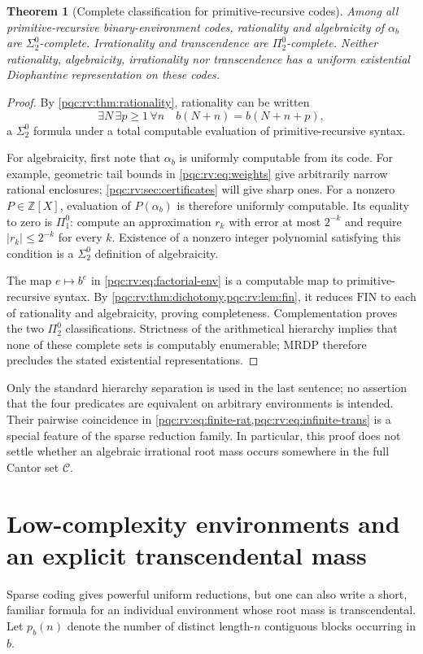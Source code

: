 \documentclass[11pt,letterpaper]{article}
\numberwithin{equation}{section}
\newtheorem{theorem}{Theorem}[section]
\theoremstyle{definition}
\theoremstyle{remark}
\newcommand{\Z}{\mathbb Z}
\newcommand{\srcmark}[1]{\par\noindent{\small\itshape [source~#1]}\par}
\begin{document}
\begin{theorem}[Complete classification for primitive-recursive codes]
\label{pqc:rv:thm:hierarchy}
Among all primitive-recursive binary-environment codes, rationality
and algebraicity of $\alpha_b$ are $\Sigma^0_2$-complete.
Irrationality and transcendence are $\Pi^0_2$-complete.
Neither rationality, algebraicity, irrationality nor transcendence
has a uniform existential Diophantine representation on these codes.
\end{theorem}
\begin{proof}
By \cref{pqc:rv:thm:rationality}, rationality can be written
\[
 \exists N\,\exists p\geq1\,\forall n\quad
 b(N+n)=b(N+n+p),
\]
a $\Sigma^0_2$ formula under a total computable evaluation of
primitive-recursive syntax.

For algebraicity, first note that $\alpha_b$ is uniformly computable
from its code. For example, geometric tail bounds in
\cref{pqc:rv:eq:weights} give arbitrarily narrow rational enclosures;
\cref{pqc:rv:sec:certificates} will give sharp ones. For a nonzero
$P\in\Z[X]$, evaluation of $P(\alpha_b)$ is therefore uniformly
computable. Its equality to zero is $\Pi^0_1$: compute an
approximation $r_k$ with error at most $2^{-k}$ and require
$|r_k|\leq2^{-k}$ for every $k$. Existence of a nonzero integer
polynomial satisfying this condition is a $\Sigma^0_2$ definition
of algebraicity.

The map $e\mapsto b^e$ in \cref{pqc:rv:eq:factorial-env} is a computable
map to primitive-recursive syntax. By \cref{pqc:rv:thm:dichotomy,pqc:rv:lem:fin},
it reduces $\mathrm{FIN}$ to each of rationality and algebraicity,
proving completeness. Complementation proves the two $\Pi^0_2$
classifications. Strictness of the arithmetical hierarchy implies
that none of these complete sets is computably enumerable; MRDP
therefore precludes the stated existential representations.
\end{proof}

Only the standard hierarchy separation is used in the last sentence;
no assertion that the four predicates are equivalent on arbitrary
environments is intended. Their pairwise coincidence in
\cref{pqc:rv:eq:finite-rat,pqc:rv:eq:infinite-trans} is a special feature of the
sparse reduction family. In particular, this proof does not settle
whether an algebraic irrational root mass occurs somewhere in the
full Cantor set $\mathcal C$.

\section{Low-complexity environments and an explicit transcendental mass}
\label{pqc:rv:sec:complexity}
\srcmark{17}
Sparse coding gives powerful uniform reductions, but one can also
write a short, familiar formula for an individual environment whose
root mass is transcendental. Let $p_b(n)$ denote the number of distinct
length-$n$ contiguous blocks occurring in $b$.
\end{document}
